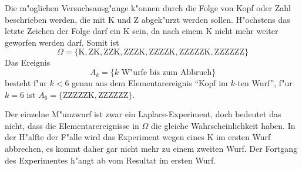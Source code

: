 \begin{loesung}
\begin{teilaufgaben}
\item
Die m"oglichen Versuchsausg"ange k"onnen durch die Folge von Kopf oder Zahl
beschrieben werden, die mit K und Z abgek"urzt werden sollen.
H"ochstens das letzte Zeichen der Folge darf ein K sein, da nach einem
K nicht mehr weiter geworfen werden darf.
Somit ist
\[
\Omega = \{
\text{K},
\text{ZK},
\text{ZZK},
\text{ZZZK},
\text{ZZZZK},
\text{ZZZZZK},
\text{ZZZZZZ}
\}
\]
Das Ereignis 
\[
A_k=\{
\text{$k$ W"urfe bis zum Abbruch}
\}
\]
besteht f"ur $k<6$ genau aus dem Elementarereignis ``Kopf im $k$-ten Wurf'',
f"ur $k=6$ ist $A_6= \{\text{ZZZZZK}, \text{ZZZZZZ}\}$.
\item
Der einzelne M"unzwurf ist zwar ein Laplace-Experiment, doch bedeutet das
nicht, dass die Elementarereignisse in $\Omega$ die gleiche Wahrscheinlichkeit
haben.
In der H"alfte der F"alle wird das Experiment wegen eines K im ersten Wurf abbrechen,
es kommt daher gar nicht mehr zu einem zweiten Wurf.
Der Fortgang des Experimentes h"angt ab vom Resultat im ersten Wurf.


\end{teilaufgaben}
\end{loesung}
